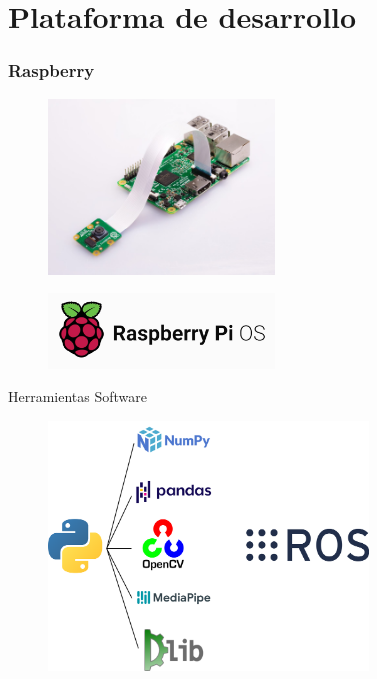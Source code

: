 \documentclass{beamer}
\begin{document}
\section{Plataforma de desarrollo}
\begin{frame}
\frametitle{Raspberry}
\begin{figure}
    \centering
    \includegraphics[width=6cm]{figs/pi-camera-attached.jpg}
\end{figure}
\begin{figure}
    \centering
    \includegraphics[width=6cm]{figs/Raspberry_Pi_OS_Logo.png}
\end{figure}
\end{frame}

\begin{frame}{Herramientas Software}
\begin{figure}
    \centering
    \includegraphics[width=8.5cm]{figs/herramientas_software.png}
\end{figure}
\end{frame}
\end{document}
